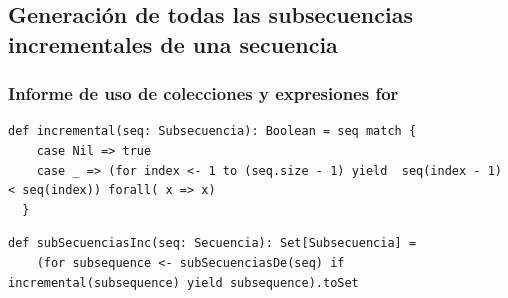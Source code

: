 \documentclass[12pt, a4paper]{article}
\begin{document}
\subsection{Generación de todas las subsecuencias incrementales de una secuencia}
\subsubsection{Informe de uso de colecciones y expresiones for}
\begin{lstlisting}[caption=Código en Scala para la funcion incremental, label=lst:scala_code]
  def incremental(seq: Subsecuencia): Boolean = seq match {
    case Nil => true
    case _ => (for index <- 1 to (seq.size - 1) yield  seq(index - 1) < seq(index)) forall( x => x)
  }
            \end{lstlisting}
  \begin{lstlisting}[caption=Código en Scala para la funcion subSecuenciasInc, label=lst:scala_code]
  def subSecuenciasInc(seq: Secuencia): Set[Subsecuencia] = 
    (for subsequence <- subSecuenciasDe(seq) if incremental(subsequence) yield subsequence).toSet
              \end{lstlisting}
\end{document}
